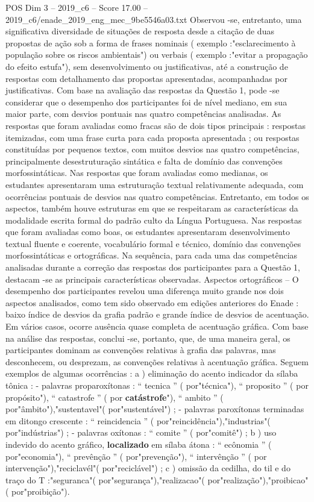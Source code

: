 \begin{textsample}{POS Dim 3 – 2019\_c6 – Score 17.00 – 2019\_c6/enade\_2019\_eng\_mec\_9be5546a03.txt}
Observou -se, entretanto, uma significativa diversidade de situações de resposta desde a citação de duas propostas de ação sob a forma de frases nominais ( exemplo :"esclarecimento à população sobre os riscos ambientais") ou verbais ( exemplo :"evitar a propagação do efeito estufa"), sem desenvolvimento ou justificativas, até a construção de respostas com detalhamento das propostas apresentadas, acompanhadas por justificativas.
Com base na avaliação das respostas da Questão 1, pode -se considerar que o desempenho dos participantes foi de nível mediano, em sua maior parte, com desvios pontuais nas quatro competências analisadas.
As respostas que foram avaliadas como fracas são de dois tipos principais : respostas itemizadas, com uma frase curta para cada proposta apresentada ; ou respostas constituídas por pequenos textos, com muitos desvios nas quatro competências, principalmente desestruturação sintática e falta de domínio das convenções morfossintáticas.
Nas respostas que foram avaliadas como medianas, os estudantes apresentaram uma estruturação textual relativamente adequada, com ocorrências pontuais de desvios nas quatro competências.
Entretanto, em todos os aspectos, também houve estruturas em que se respeitaram as características da modalidade escrita formal do padrão culto da Língua Portuguesa.
Nas respostas que foram avaliadas como boas, os estudantes apresentaram desenvolvimento textual fluente e coerente, vocabulário formal e técnico, domínio das convenções morfossintáticas e ortográficas.
Na sequência, para cada uma das competências analisadas durante a correção das respostas dos participantes para a Questão 1, destacam -se as principais características observadas.
Aspectos ortográficos – O desempenho dos participantes revelou uma diferença muito grande nos dois aspectos analisados, como tem sido observado em edições anteriores do Enade : baixo índice de desvios da grafia padrão e grande índice de desvios de acentuação.
Em vários casos, ocorre ausência quase completa de acentuação gráfica.
Com base na análise das respostas, conclui -se, portanto, que, de uma maneira geral, os participantes dominam as convenções relativas à grafia das palavras, mas desconhecem, ou desprezam, as convenções relativas à acentuação gráfica.
Seguem exemplos de algumas ocorrências : a ) eliminação do acento indicador da sílaba tônica : - palavras proparoxítonas : “ tecnica ” ( por"técnica"), “ proposito ” ( por propósito"), “ catastrofe ” ( por \textbf{catástrofe}"), “ ambito ” ( por"âmbito"),"sustentavel"( por"sustentável") ; - palavras paroxítonas terminadas em ditongo crescente : “ reincidencia ” ( por"reincidência"),"industrias"( por"indústrias") ; - palavras oxítonas : “ comite ” ( por"comitê") ; b ) uso indevido do acento gráfico, \textbf{localizado} em sílaba átona : “ ecônomia ” ( por"economia"), “ prevênção ” ( por"prevenção"), “ intervênção ” ( por intervenção"),"reciclavél"( por"reciclável") ; c ) omissão da cedilha, do til e do traço do T :"seguranca"( por"segurança"),"realizacao"( por"realização"),"proibicao"( por"proibição").

\end{textsample}
